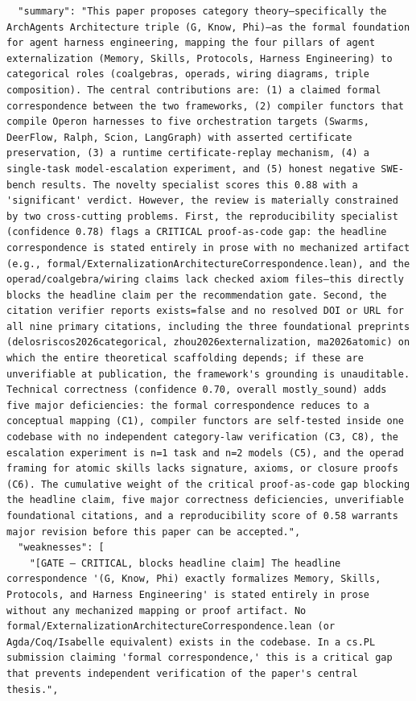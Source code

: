 \documentclass[11pt]{article}
\begin{document}
\begin{verbatim}
  "summary": "This paper proposes category theory—specifically the ArchAgents Architecture triple (G, Know, Phi)—as the formal foundation for agent harness engineering, mapping the four pillars of agent externalization (Memory, Skills, Protocols, Harness Engineering) to categorical roles (coalgebras, operads, wiring diagrams, triple composition). The central contributions are: (1) a claimed formal correspondence between the two frameworks, (2) compiler functors that compile Operon harnesses to five orchestration targets (Swarms, DeerFlow, Ralph, Scion, LangGraph) with asserted certificate preservation, (3) a runtime certificate-replay mechanism, (4) a single-task model-escalation experiment, and (5) honest negative SWE-bench results. The novelty specialist scores this 0.88 with a 'significant' verdict. However, the review is materially constrained by two cross-cutting problems. First, the reproducibility specialist (confidence 0.78) flags a CRITICAL proof-as-code gap: the headline correspondence is stated entirely in prose with no mechanized artifact (e.g., formal/ExternalizationArchitectureCorrespondence.lean), and the operad/coalgebra/wiring claims lack checked axiom files—this directly blocks the headline claim per the recommendation gate. Second, the citation verifier reports exists=false and no resolved DOI or URL for all nine primary citations, including the three foundational preprints (delosriscos2026categorical, zhou2026externalization, ma2026atomic) on which the entire theoretical scaffolding depends; if these are unverifiable at publication, the framework's grounding is unauditable. Technical correctness (confidence 0.70, overall mostly_sound) adds five major deficiencies: the formal correspondence reduces to a conceptual mapping (C1), compiler functors are self-tested inside one codebase with no independent category-law verification (C3, C8), the escalation experiment is n=1 task and n=2 models (C5), and the operad framing for atomic skills lacks signature, axioms, or closure proofs (C6). The cumulative weight of the critical proof-as-code gap blocking the headline claim, five major correctness deficiencies, unverifiable foundational citations, and a reproducibility score of 0.58 warrants major revision before this paper can be accepted.",
  "weaknesses": [
    "[GATE — CRITICAL, blocks headline claim] The headline correspondence '(G, Know, Phi) exactly formalizes Memory, Skills, Protocols, and Harness Engineering' is stated entirely in prose without any mechanized mapping or proof artifact. No formal/ExternalizationArchitectureCorrespondence.lean (or Agda/Coq/Isabelle equivalent) exists in the codebase. In a cs.PL submission claiming 'formal correspondence,' this is a critical gap that prevents independent verification of the paper's central thesis.",

\end{verbatim}
\end{document}

